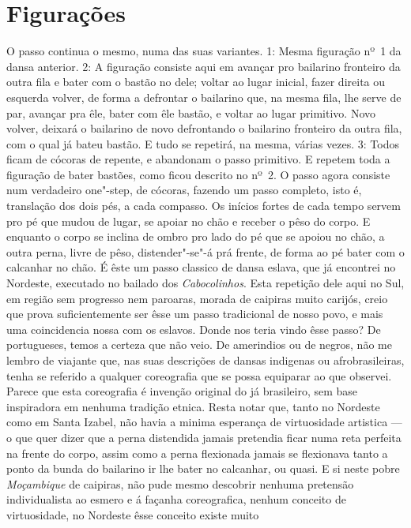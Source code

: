 \section*{Figurações}

O passo continua o mesmo, numa das suas variantes. 1: Mesma figuração nº~1 da dansa anterior. 2: A figuração consiste aqui em avançar pro
bailarino fronteiro da outra fila e bater com o bastão no dele; voltar
ao lugar inicial, fazer direita ou esquerda volver, de forma a defrontar
o bailarino que, na mesma fila, lhe serve de par, avançar pra êle, bater
com êle bastão, e voltar ao lugar primitivo. Novo volver, deixará o
bailarino de novo defrontando o bailarino fronteiro da outra fila, com o
qual já bateu bastão. E tudo se repetirá, na mesma, várias vezes. 3:
Todos ficam de cócoras de repente, e abandonam o passo primitivo. E
repetem toda a figuração de bater bastões, como ficou descrito no nº~2.
O passo agora consiste num verdadeiro one"-step, de cócoras, fazendo um
passo completo, isto é, translação dos dois pés, a cada compasso. Os
inícios fortes de cada tempo servem pro pé que mudou de lugar, se apoiar
no chão e receber o pêso do corpo. E enquanto o corpo se inclina de
ombro pro lado do pé que se apoiou no chão, a outra perna, livre de
pêso, distender"-se"-á prá frente, de forma ao pé bater com o calcanhar no
chão. É êste um passo classico de dansa eslava, que já encontrei no
Nordeste, executado no bailado dos \emph{Cabocolinhos}. Esta repetição
dele aqui no Sul, em região sem progresso nem paroaras, morada de
caipiras muito carijós, creio que prova suficientemente ser êsse um
passo tradicional de nosso povo, e mais uma coincidencia nossa com os
eslavos. Donde nos teria vindo êsse passo? De portugueses, temos a
certeza que não veio. De amerindios ou de negros, não me lembro de
viajante que, nas suas descrições de dansas indigenas ou
afrobrasileiras, tenha se referido a qualquer coreografia que se possa
equiparar ao que observei. Parece que esta coreografia é invenção
original do já brasileiro, sem base inspiradora em nenhuma tradição
etnica. Resta notar que, tanto no Nordeste como em Santa Izabel, não
havia a minima esperança de virtuosidade artistica --- o que quer dizer
que a perna distendida jamais pretendia ficar numa reta perfeita na
frente do corpo, assim como a perna flexionada jamais se flexionava
tanto a ponto da bunda do bailarino ir lhe bater no calcanhar, ou quasi.
E si neste pobre \emph{Moçambique} de caipiras, não pude mesmo descobrir
nenhuma pretensão individualista ao esmero e á façanha coreografica,
nenhum conceito de virtuosidade, no Nordeste êsse conceito existe muito
